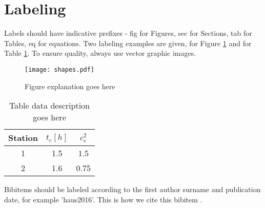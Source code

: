 \section{Labeling}
\label{sec:labeling}

Labels should have indicative prefixes - fig for Figures, sec for Sections, tab for Tables, eq for equations. Two labeling examples are given, for Figure \ref{fig:shapes} and for Table \ref{tab:experiment1_data}. To ensure quality, always use vector graphic images. 

\begin{figure}[ht!]
	\centering
		\texttt{[image: shapes.pdf]}
	\caption{Figure explanation goes here}
	\label{fig:shapes}
\end{figure}

\begin{table}[ht!]
	\centering
	\begin{tabular}{ccc}
		\toprule
		Station & $t_e [h]$ & $c_e^2$ \\
		\midrule
		1       & 1.5       & 1.5\\
		2       & 1.6       & 0.75\\
		\bottomrule
	\end{tabular}
	\caption{Table data description goes here}
	\label{tab:experiment1_data}
\end{table}

Bibitems should be labeled according to the first author surname and publication date, for example 'haus2016'. This is how we cite this bibitem \cite{haus2016}.


